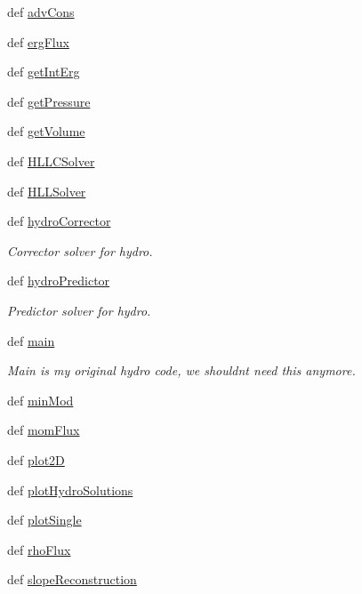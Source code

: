 \begin{DoxyCompactItemize}
\item 
def \hyperlink{namespacesrc_1_1_muscl_hanc_ade24903eca1238058267cd23d9d801fc}{adv\-Cons}
\item 
def \hyperlink{namespacesrc_1_1_muscl_hanc_ad23caa5b14e969c440cf2b252fd6b1a2}{erg\-Flux}
\item 
def \hyperlink{namespacesrc_1_1_muscl_hanc_afe1723988c5a5267d18ff9476df89790}{get\-Int\-Erg}
\item 
def \hyperlink{namespacesrc_1_1_muscl_hanc_a2d178cf1cadff5d732656c30f2a9b861}{get\-Pressure}
\item 
def \hyperlink{namespacesrc_1_1_muscl_hanc_ae2ddd173a646e89b12c2461f5c45874a}{get\-Volume}
\item 
def \hyperlink{namespacesrc_1_1_muscl_hanc_a03a9255024224353a0170b402f09fa80}{H\-L\-L\-C\-Solver}
\item 
def \hyperlink{namespacesrc_1_1_muscl_hanc_a38faa5e281253b4325d831e07ad88666}{H\-L\-L\-Solver}
\item 
def \hyperlink{namespacesrc_1_1_muscl_hanc_ab9ce990167303930a361b03f3c230726}{hydro\-Corrector}
\begin{DoxyCompactList}\small\item\em Corrector solver for hydro. \end{DoxyCompactList}\item 
def \hyperlink{namespacesrc_1_1_muscl_hanc_a5a28a779b62a90fc19782d2814eb4dc9}{hydro\-Predictor}
\begin{DoxyCompactList}\small\item\em Predictor solver for hydro. \end{DoxyCompactList}\item 
def \hyperlink{namespacesrc_1_1_muscl_hanc_a580462093ccf4bf9a916537de4935caf}{main}
\begin{DoxyCompactList}\small\item\em Main is my original hydro code, we shouldnt need this anymore. \end{DoxyCompactList}\item 
def \hyperlink{namespacesrc_1_1_muscl_hanc_a39159a54fe21dc897f761cefa0f6314a}{min\-Mod}
\item 
def \hyperlink{namespacesrc_1_1_muscl_hanc_a009e09e7699202cbefd6ded237fc58d6}{mom\-Flux}
\item 
def \hyperlink{namespacesrc_1_1_muscl_hanc_a7f1a3ce6fe8741016cb4eadd253391ae}{plot2\-D}
\item 
def \hyperlink{namespacesrc_1_1_muscl_hanc_aeee7e33a3d044d1ae221fbfb9cf0e9f2}{plot\-Hydro\-Solutions}
\item 
def \hyperlink{namespacesrc_1_1_muscl_hanc_a1a1f834022191e3ac8aed54a6aad3890}{plot\-Single}
\item 
def \hyperlink{namespacesrc_1_1_muscl_hanc_adfc329f2e09f5773b1296111868d1ddb}{rho\-Flux}
\item 
def \hyperlink{namespacesrc_1_1_muscl_hanc_aa761b91519d89b31df5507bffd2ef7de}{slope\-Reconstruction}
\end{DoxyCompactItemize}


